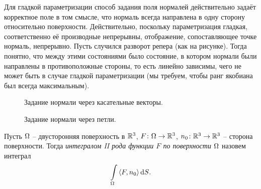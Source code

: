 \begin{remark}
    Для гладкой параметризации способ задания поля нормалей действительно задаёт корректное
    поле в том смысле, что нормаль всегда направлена в одну сторону относительно поверхности.
    Действительно, поскольку параметризация гладкая, соответственно её производные непрерывны,
    отображение, сопоставляющее точке нормаль, непрерывно. Пусть случился разворот репера (как
    на рисунке). Тогда понятно, что между этими состояниями было состояние, в котором
    нормали были направлены в противоположные стороны, то есть линейно зависимы, чего не может
    быть в случае гладкой параметризации (мы требуем, чтобы ранг якобиана был всегда максимальным).
\end{remark}

\begin{figure}[ht]
    \centering
    \caption{Задание нормали через касательные векторы.}
\end{figure}

\begin{figure}[h!]
    \centering
    \caption{Задание нормали через петли.}
\end{figure}

\begin{definition}
    Пусть $\Omega$ -- двусторонняя поверхность в $\mathbb{R}^3$, $F \colon \Omega \to \mathbb{R}^3$, 
    $n_0 \colon \mathbb{R}^3 \to \mathbb{R}^3$ -- сторона поверхности. Тогда \textit{
    интегралом II рода функции $F$ по поверхности $\Omega$} назовем интеграл
\[
    \int\limits_{\Omega}{\langle F, n_0 \rangle \,\mathrm{d} S}
.\] 
\end{definition}

